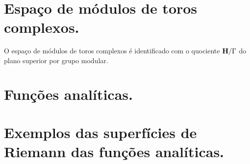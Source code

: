\section{Espaço de módulos de toros complexos.}

\begin{teorema}
O espaço de módulos de toros complexos é identificado com o quociente $\mathbf{H}/\Gamma$
do plano superior por grupo modular.
\end{teorema}

\section{Funções analíticas.}

\section{Exemplos das superfícies de Riemann das funções analíticas.}
